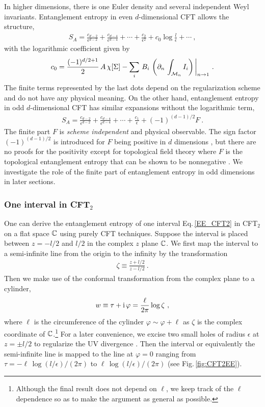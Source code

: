 In higher dimensions, there is one Euler density and several independent Weyl invariants.
Entanglement entropy in even $d$-dimensional CFT allows the structure,
\begin{align}\label{EE_Even}
S_A = \frac{c_{d-2}}{\epsilon^{d-2}} + \frac{c_{d-4}}{\epsilon^{d-4}} + \cdots + \frac{c_2}{\epsilon^2} +  c_0\log \frac{l}{\epsilon}  + \cdots \ ,
\end{align}
with the logarithmic coefficient given by
\begin{align}\label{Log_EE_C0}
	c_0 = \frac{(-1)^{d/2+1}}{2}\, A \, \chi [\Sigma] - \sum_i\, B_i\,\left( \partial_n \, \int_{{\cal M}_n} I_i\right)\bigg|_{n\to 1} \ .
\end{align}
The finite terms represented by the last dots depend on the regularization scheme and do not have any physical meaning.
On the other hand, entanglement entropy in odd $d$-dimensional CFT has similar expansions without the logarithmic term,
\begin{align}\label{EE_Odd}
S_A = \frac{c_{d-2}}{\epsilon^{d-2}} + \frac{c_{d-4}}{\epsilon^{d-4}} + \cdots + \frac{c_1}{\epsilon}  + (-1)^{(d-1)/2}F \ .
\end{align}
The finite part $F$ is {\it scheme independent} and physical observable.
The sign factor $(-1)^{(d-1)/2}$ is introduced for $F$ being positive in $d$ dimensions \cite{Klebanov:2011gs}, but there are no proofs for the positivity except for topological field theory where $F$ is the topological entanglement entropy that can be shown to be nonnegative \cite{Kitaev:2005dm,Levin:2006zz}.
We investigate the role of the finite part of entanglement entropy in odd dimensions in later sections.


\subsubsection{One interval in CFT$_2$}
One can derive the entanglement entropy of one interval Eq.\,\eqref{EE_CFT2} in CFT$_2$ on a flat space $\mathbb{C}$ using purely CFT techniques.
Suppose the interval is placed between $z = -l/2$ and $l/2$ in the complex $z$ plane $\mathbb{C}$.
We first map the interval to a semi-infinite line from the origin to the infinity by the transformation 
\begin{align}
	\zeta\equiv \frac{z+l/2}{z-l/2} \ .
\end{align}
Then we make use of the conformal transformation from the complex plane to a cylinder,
\begin{align}\label{ConfMapCyl}
w\equiv \tau + \mathrm{i}\, \varphi = \frac{\ell}{2\pi} \log \zeta \ ,
\end{align}
where $\ell$ is the circumference of the cylinder $\varphi \sim \varphi + \ell$ as $\zeta$ is the complex coordinate of $\mathbb{C}$.\footnote{Although the final result does not depend on $\ell$, we keep track of the $\ell$ dependence so as to make the argument as general as possible.}
For a later convenience, we excise two small holes of radius $\epsilon$ at $z=\pm l/2$ to regularize the UV divergence \cite{Ohmori:2014eia}.
Then the interval or equivalently the semi-infinite line is mapped to the line at $\varphi=0$ ranging from $\tau=- \ell\, \log (l/\epsilon)/(2\pi)$ to $\ell\, \log (l/\epsilon)/(2\pi)$ (see Fig.\,\ref{fig:CFT2EE}).

